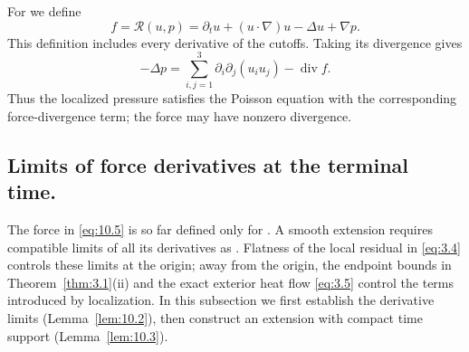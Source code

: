 For  we define
\begin{equation}
f=\mathscr R(u,p)=\partial_tu+(u\mathbin{\cdot}\nabla)u-\Delta u+\nabla p.
\tag{10.5}\label{eq:10.5}
\end{equation}
This definition includes every derivative of the cutoffs. Taking its divergence gives
\[
-\Delta p=\sum_{i,j=1}^3\partial_i\partial_j(u_iu_j)-\operatorname{div}f.
\]
Thus the localized pressure satisfies the Poisson equation with the corresponding force-divergence
term; the force may have nonzero divergence.

\subsection{Limits of force derivatives at the terminal time.}\label{sec:10.2}
The force in \eqref{eq:10.5} is so far defined only for . A smooth
extension requires compatible limits of all its derivatives as
. Flatness of the local residual in \eqref{eq:3.4} controls these
limits at the origin; away from the origin, the endpoint bounds in
Theorem~\ref{thm:3.1}\textup{(ii)} and the exact exterior heat flow \eqref{eq:3.5} control the terms
introduced by localization. In this subsection we first establish the derivative limits
(Lemma~\ref{lem:10.2}), then construct an extension with compact time support
(Lemma~\ref{lem:10.3}).

